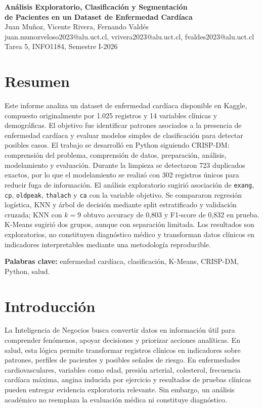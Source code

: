 \documentclass[10pt,a4paper]{article}
\begin{document}
\begin{center}
  {\LARGE \textbf{Análisis Exploratorio, Clasificación y Segmentación}} \\[3pt]
  {\LARGE \textbf{de Pacientes en un Dataset de Enfermedad Cardíaca}} \\[8pt]
  {\normalsize Juan Muñoz, Vicente Rivera, Fernando Valdés} \\[2pt]
  {\small juan.munozveloso2023@alu.uct.cl, vrivera2023@alu.uct.cl, fvaldes2023@alu.uct.cl} \\[2pt]
  {\small Tarea 5, INFO1184, Semestre I-2026}
\end{center}

\section*{Resumen}

Este informe analiza un dataset de enfermedad cardíaca disponible en Kaggle, compuesto originalmente por 1.025 registros y 14 variables clínicas y demográficas. El objetivo fue identificar patrones asociados a la presencia de enfermedad cardíaca y evaluar modelos simples de clasificación para detectar posibles casos. El trabajo se desarrolló en Python siguiendo CRISP-DM: comprensión del problema, comprensión de datos, preparación, análisis, modelamiento y evaluación. Durante la limpieza se detectaron 723 duplicados exactos, por lo que el modelamiento se realizó con 302 registros únicos para reducir fuga de información. El análisis exploratorio sugirió asociación de \texttt{exang}, \texttt{cp}, \texttt{oldpeak}, \texttt{thalach} y \texttt{ca} con la variable objetivo. Se compararon regresión logística, KNN y árbol de decisión mediante split estratificado y validación cruzada; KNN con $k=9$ obtuvo accuracy de 0,803 y F1-score de 0,832 en prueba. K-Means sugirió dos grupos, aunque con separación limitada. Los resultados son exploratorios, no constituyen diagnóstico médico y transforman datos clínicos en indicadores interpretables mediante una metodología reproducible.

\textbf{Palabras clave:} enfermedad cardíaca, clasificación, K-Means, CRISP-DM, Python, salud.

\section{Introducción}

La Inteligencia de Negocios busca convertir datos en información útil para comprender fenómenos, apoyar decisiones y priorizar acciones analíticas. En salud, esta lógica permite transformar registros clínicos en indicadores sobre patrones, perfiles de pacientes y posibles señales de riesgo. En enfermedades cardiovasculares, variables como edad, presión arterial, colesterol, frecuencia cardíaca máxima, angina inducida por ejercicio y resultados de pruebas clínicas pueden entregar evidencia exploratoria relevante. Sin embargo, un análisis académico no reemplaza la evaluación médica ni constituye diagnóstico.
\end{document}

